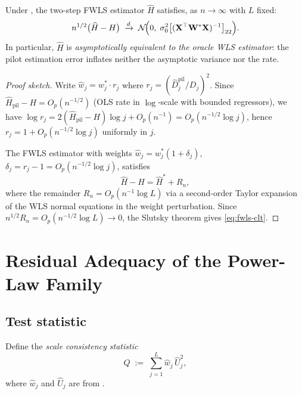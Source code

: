 \documentclass[10pt,a4paper,twocolumn]{article}
\newcommand{\dto}{\xrightarrow{d}}
\newcommand{\Hhat}{\widehat{H}}
\newcommand{\calN}{\mathcal{N}}
\begin{document}
\begin{theorem}
\label{thm:clt-fwls}
Under , the two-step FWLS estimator
$\Hhat$ satisfies, as $n \to \infty$ with $L$ fixed:
\begin{equation}
    n^{1/2}\bigl(\Hhat - H\bigr) \;\dto\;
    \calN\!\Bigl(0,\; \sigma_0^2
    \bigl[(\mathbf{X}^\top \mathbf{W}^* \mathbf{X})^{-1}\bigr]_{22}\Bigr).
    \label{eq:fwls-clt}
\end{equation}
In particular, $\Hhat$ is \emph{asymptotically equivalent to the oracle
WLS estimator}: the pilot estimation error inflates neither the asymptotic
variance nor the rate.
\end{theorem}

\begin{proof}[Proof sketch]
Write $\hat w_j = w_j^* \cdot r_j$ where $r_j = (\hat D_j^{\mathrm{pil}}
/ D_j)^2$.  Since $\hat H_{\mathrm{pil}} - H = O_p(n^{-1/2})$ (OLS
rate in $\log$-scale with bounded regressors), we have
$\log r_j = 2(\hat H_{\mathrm{pil}} - H)\log j + O_p(n^{-1}) = O_p(n^{-1/2}\log j)$,
hence $r_j = 1 + O_p(n^{-1/2}\log j)$ uniformly in $j$.

The FWLS estimator with weights $\hat w_j = w_j^*(1 + \delta_j)$,
$\delta_j = r_j - 1 = O_p(n^{-1/2}\log j)$, satisfies
\[
    \Hhat - H = \hat H^* + R_n,
\]
where the remainder $R_n = O_p(n^{-1}\log L)$ via a second-order
Taylor expansion of the WLS normal equations in the weight perturbation.
Since $n^{1/2} R_n = O_p(n^{-1/2}\log L) \to 0$, the Slutsky theorem
gives \eqref{eq:fwls-clt}.
\end{proof}

\section{Residual Adequacy of the Power-Law Family}
\label{sec:test}

\subsection{Test statistic}

Define the \emph{scale consistency statistic}
\begin{equation}
    Q \;:=\; \sum_{j=1}^{L} \hat w_j \,\hat U_j^2,
    \label{eq:Q-stat}
\end{equation}
where $\hat w_j$ and $\hat U_j$ are from .
\end{document}
